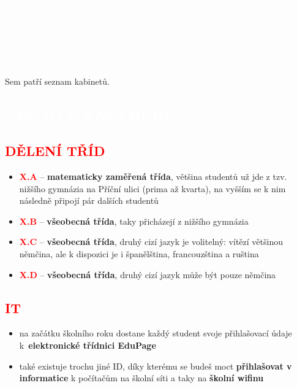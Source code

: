 \documentclass{article}
\newcommand{\nadpis}[1]{
  \vspace*{-60pt}
  \begin{nadpisbox}
    \vspace*{20pt}
    \centering \section*{\textcolor{white}{#1}}
  \end{nadpisbox}
}
\newcommand{\podnadpis}[1]{
  \subsection*{\textcolor{red}{#1}}
}
\begin{document}
\begin{titlepage}
  \pagecolor{red}
    \begin{center}
      \vspace*{\fill}

      \textcolor{white}{\fontsize{60}{60} \Kapitan Průvodce\\\vspace{0.2em}prváka}

      \vspace*{\fill}
      \textcolor{white}{\fontsize{20}{20} \Kapitan Jaroška}

      \vspace{0.5em}

      \begin{bluebox}
        \centering \fontsize{15}{15} \Kapitan \textcolor{white}{2024/2025}
      \end{bluebox}

      \vspace{3em}

    \end{center}
\end{titlepage}
\pagecolor{white}



\newpage

\noindent
{}
Sem patří seznam kabinetů.
\newpage
{}

\nadpis{JAK TO U NÁS CHODÍ}
\noindent \podnadpis{DĚLENÍ TŘÍD}
\begin{itemize}[leftmargin=10pt]
  \item \textcolor{red}{\textbf{X.A}} --  \textbf{matematicky zaměřená třída}, většina studentů už jde z tzv. nižšího gymnázia na Příční ulici (prima až kvarta), na vyšším se k nim následně připojí pár dalších studentů
  \item \textcolor{red}{\textbf{X.B}} -- \textbf{všeobecná třída}, taky přicházejí z nižšího gymnázia
  \item \textcolor{red}{\textbf{X.C}} -- \textbf{všeobecná třída}, druhý cizí jazyk je volitelný: vítězí většinou němčina, ale
k dispozici je i španělština, francouzština a ruština
  \item \textcolor{red}{\textbf{X.D}} -- \textbf{všeobecná třída}, druhý cizí jazyk může být pouze němčina
\end{itemize}
\podnadpis{IT}
\begin{itemize}[leftmargin=10pt]
  \item na začátku školního roku dostane každý student svoje přihlašovací údaje k~\textbf{elektronické třídnici EduPage}
  \item také existuje trochu jiné ID, díky kterému se budeš moct \textbf{přihlašovat v informatice} k počítačům na školní síti a taky na \textbf{školní wifinu}
\end{itemize}
\end{document}
